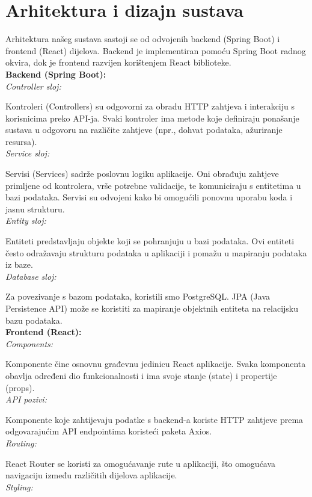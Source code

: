 \chapter{Arhitektura i dizajn sustava}
		
	Arhitektura našeg sustava sastoji se od odvojenih backend (Spring Boot) i frontend (React) dijelova. Backend je implementiran pomoću Spring Boot radnog okvira, dok je frontend razvijen korištenjem React biblioteke. 
	\\
	\textbf{Backend (Spring Boot):}
	\\
	\textit{Controller sloj:}
	
	Kontroleri (Controllers) su odgovorni za obradu HTTP zahtjeva i interakciju s korisnicima preko API-ja.
	Svaki kontroler ima metode koje definiraju ponašanje sustava u odgovoru na različite zahtjeve (npr., dohvat podataka, ažuriranje resursa).
	\\
	\textit{Service sloj:}
	
	Servisi (Services) sadrže poslovnu logiku aplikacije.
	Oni obrađuju zahtjeve primljene od kontrolera, vrše potrebne validacije, te komuniciraju s entitetima u bazi podataka.
	Servisi su odvojeni kako bi omogućili ponovnu uporabu koda i jasnu strukturu.
	\\
	\textit{Entity sloj:}
	
	Entiteti predstavljaju objekte koji se pohranjuju u bazi podataka.
	Ovi entiteti često odražavaju strukturu podataka u aplikaciji i pomažu u mapiranju podataka iz baze.
	\\
	\textit{Database sloj:}
	
	Za povezivanje s bazom podataka, koristili smo PostgreSQL.
	JPA (Java Persistence API) može se koristiti za mapiranje objektnih entiteta na relacijsku bazu podataka.
	\\
	\textbf{Frontend (React):}
	\\
	\textit{Components:}
	
	Komponente čine osnovnu građevnu jedinicu React aplikacije.
	Svaka komponenta obavlja određeni dio funkcionalnosti i ima svoje stanje (state) i propertije (props).
	\\
	\textit{API pozivi:}
	
	Komponente koje zahtijevaju podatke s backend-a koriste HTTP zahtjeve prema odgovarajućim API endpointima koristeći
	paketa Axios.
	\\
	\textit{Routing:}
	
	React Router se koristi za omogućavanje rute u aplikaciji, što omogućava navigaciju između različitih dijelova aplikacije.
	\\
	\textit{Styling:}
	
